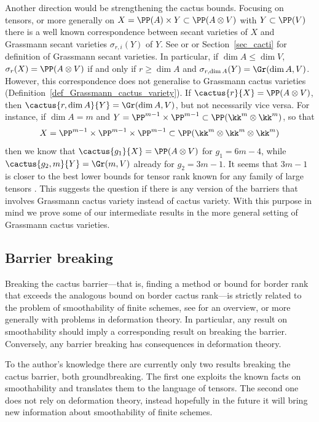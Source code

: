 \documentclass[12pt,a4paper]{article}
\begin{document}
Another direction would be strengthening the cactus bounds. Focusing on tensors, or more generally on $X=\PP(A) \times Y \subset \PP(A\otimes V)$ with $Y\subset \PP(V)$
there is a well known correspondence between
secant varieties of $X$ and Grassmann secant varieties $\sigma_{r,i}(Y)$ of $Y$.
See \cite{chiantini_coppens_Grassmannians_of_secant_varieties} or \cite{landsberg_jabu_ranks_of_tensors} or Section~\ref{sec_cacti} for definition of Grassmann secant varieties.
In particular,
if  $\dim A\leqslant \dim V$,
$\sigma_r(X)=\PP(A\otimes V)$
if and only if $r\geqslant\dim A$ and $\sigma_{r,\dim A}(Y)=\Gr(\dim A, V)$.
However, this correspondence does not generalise to Grassmann cactus varieties
(Definition~\ref{def_Grassmann_cactus_variety}).
If $\cactus{r}{X}=\PP(A\otimes V)$,
  then  $\cactus{r,\dim A}{Y}=\Gr(\dim A, V)$,
  but not necessarily vice versa.
For instance, if $\dim A = m$
and $Y=\PP^{m-1}\times \PP^{m-1} \subset \PP(\kk^{m}\otimes \kk^{m})$,
so that
\[
   X = \PP^{m-1}\times \PP^{m-1}\times \PP^{m-1} \subset \PP(\kk^{m}\otimes \kk^{m}\otimes \kk^m)
\]
 then we know that
$\cactus{g_1}{X}=\PP(A\otimes V)$ for $g_1=6m-4$, while  $\cactus{g_2,m}{Y}=\Gr(m, V)$ already for $g_2= 3m-1$.
It seems that $3m-1$ is closer to the best lower bounds for tensor rank known for any family of large tensors \cite{landsberg_michalek_hay_in_haystack}.
This suggests the question if there is any version of the barriers that involves Grassmann cactus variety instead of cactus variety.
With this purpose in mind we prove some of our intermediate results in the more general setting of Grassmann cactus varieties.



\subsection{Barrier breaking}
\label{sec_barrier_breaking}

Breaking the cactus barrier---that is, finding a method or bound for border rank that exceeds the analogous bound on border cactus rank---is strictly related to the problem of smoothability of finite schemes,
see \cite{jelisiejew_PhD} for an overview, or more generally with problems in deformation theory.
In particular, any result on smoothability should imply a corresponding result on breaking the barrier.
Conversely, any barrier breaking has consequences in deformation theory.

To the author's knowledge there are currently only two results breaking the cactus barrier, both groundbreaking.
The first one \cite{galazka_mandziuk_rupniewski_distinguishing}
exploits the known facts on smoothability and translates them to the language of tensors.
The second one \cite{dolezalek_michalek_nonlinear_methods_for_tensors_det_eq_for_secants}
does not rely on deformation theory, instead hopefully in the future it will bring new information about smoothability of finite schemes.
\end{document}
